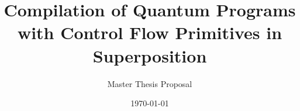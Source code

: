 \title{Compilation of Quantum Programs with Control Flow Primitives in Superposition}
\subtitle{Master Thesis \ifdefined\PROPOSAL{} Proposal \fi}
\date{\today}

\newcommand{\firstname}{Sascha}
\newcommand{\lastname}{Thiemann}
\newcommand{\matrNo}{406187}
\newcommand{\email}{sascha.thiemann@rwth-aachen.de}
\newcommand{\studyProgram}{Computer Science M.Sc.}

\newcommand{\firstsupervisor}{apl. Prof.\ Dr.\ Thomas Noll}
\newcommand{\firstsupervisorchair}{Chair for Software Modeling and Verification}
\newcommand{\firstsupervisoruniversity}{RWTH Aachen University}

\newcommand{\secondsupervisor}{Prof. Dr. rer. nat. Dominique Unruh}
\newcommand{\secondsupervisorchair}{Chair for Quantum Information Systems }
\newcommand{\secondsupervisoruniversity}{RWTH Aachen University}



